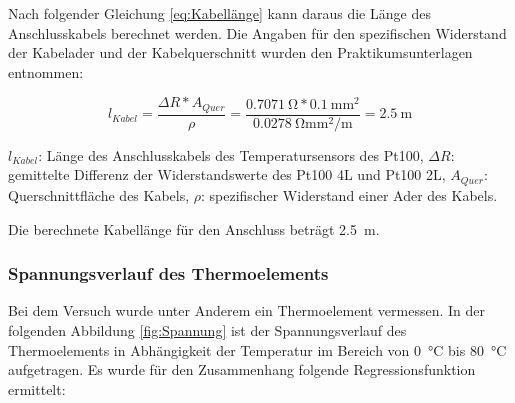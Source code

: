 Nach folgender Gleichung \ref{eq:Kabellänge} kann daraus die Länge des Anschlusskabels berechnet werden. Die Angaben für den spezifischen Widerstand der Kabelader und der Kabelquerschnitt wurden den Praktikumsunterlagen entnommen:

\begin{equation}
\label{eq:Kabellänge}
l_{Kabel}= \frac{\Delta R*A_{Quer}}{\rho}=\frac{\SI{0,7071}{\ohm}*\SI{0,1}{\milli\meter\squared}}{\SI{0,0278}{\ohm\milli\meter\squared\per\meter}}=\SI{2,5}{\meter}
\end{equation}

\begin{center}
	\begin{small}
		$l_{Kabel}$: Länge des Anschlusskabels des Temperatursensors des Pt100,
		$\Delta R$: gemittelte Differenz der Widerstandswerte des Pt100 4L und Pt100 2L,
		$A_{Quer}$: Querschnittfläche des Kabels,
		$\rho$: spezifischer Widerstand einer Ader des Kabels.
	\end{small}
\end{center}

Die berechnete Kabellänge für den Anschluss beträgt \SI{2,5}{\meter}.

\subsubsection{Spannungsverlauf des Thermoelements}

Bei dem Versuch wurde unter Anderem ein Thermoelement vermessen. In der folgenden Abbildung \ref{fig:Spannung} ist der Spannungsverlauf des Thermoelements in Abhängigkeit der Temperatur im Bereich von \SI{0}{\celsius} bis \SI{80}{\celsius} aufgetragen. Es wurde für den Zusammenhang folgende Regressionsfunktion ermittelt:
	

